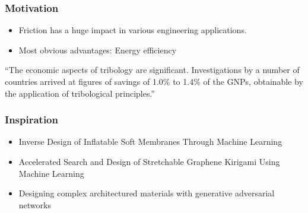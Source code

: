 \documentclass[
	11pt, %
]{beamer}
\begin{document}
\begin{frame}
	\frametitle{Motivation}
	
	\begin{itemize}
		\item Friction has a huge impact in various engineering applications.
		\item Most obvious advantages: Energy efficiency
	\end{itemize}


	\begin{exampleblock}{}
		{``The economic aspects of tribology are significant. Investigations by a number of countries arrived at figures of savings of 1.0\% to 1.4\% of the GNPs, obtainable by the application of tribological principles.''}
		\vskip5mm
		\hspace*{}
	\end{exampleblock}


	
\end{frame}




\begin{frame}
	\frametitle{Inspiration}

	\begin{itemize}
		\item Inverse Design of Inflatable Soft Membranes Through Machine Learning
		\item Accelerated Search and Design of Stretchable Graphene Kirigami Using Machine Learning
		\item Designing complex architectured materials with generative adversarial networks
	\end{itemize}


	
\end{frame}
\end{document}
